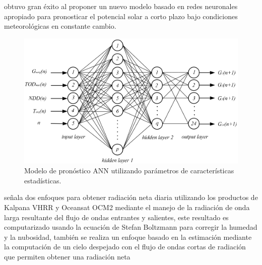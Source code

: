 \cite{wang2012shortterm} obtuvo gran éxito al proponer un nuevo modelo basado en redes neuronales apropiado para pronosticar el potencial solar a corto 
plazo bajo condiciones meteorológicas en constante cambio.

\begin{figure}[htb]
  \centering 
  \includegraphics[scale=0.35]{pictures/ER4.png}
  \caption{Modelo de pronóstico ANN utilizando parámetros de características estadísticas.} 
  \label{fig:er4}
\end{figure}
\newpage

\cite{sai2014estimation} señala dos enfoques para obtener radiación neta diaria utilizando los productos de Kalpana VHRR y Oceansat OCM2 mediante el manejo de  la radiación 
de onda larga resultante del flujo de ondas entrantes y salientes, este resultado es computarizado usando la ecuación de Stefan Boltzmann para 
corregir la humedad y la nubosidad,  también se realiza un enfoque basado en la estimación mediante la computación de un cielo despejado con el 
flujo de ondas cortas de radiación que permiten obtener una radiación neta

